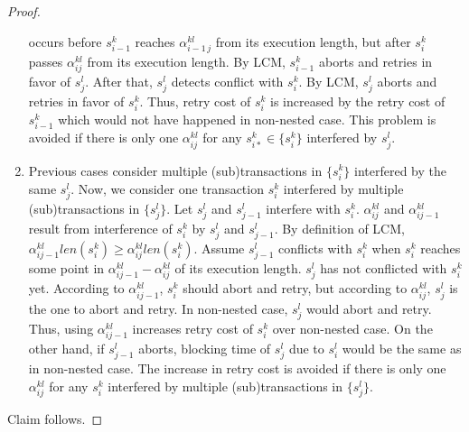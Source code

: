 \documentclass[10pt, conference, compsocconf]{IEEEtran}
\begin{document}
\begin{proof}
\begin{enumerate}
occurs before $s_{i-1}^{k}$ reaches $\alpha_{i-1\, j}^{kl}$ from
its execution length, but after $s_{i}^{k}$ passes $\alpha_{ij}^{kl}$
from its execution length. By LCM, $s_{i-1}^{k}$ aborts and retries
in favor of $s_{j}^{l}$. After that, $s_{j}^{l}$ detects conflict
with $s_{i}^{k}$. By LCM, $s_{j}^{l}$ aborts and retries in favor
of $s_{i}^{k}$. Thus, retry cost of $s_{i}^{k}$ is increased by
the retry cost of $s_{i-1}^{k}$ which would not have happened in
non-nested case. This problem is avoided if there is only one $\alpha_{ij}^{kl}$
for any $s_{i*}^{k}\in\{s_{i}^{k}\}$ interfered by $s_{j}^{l}$.
\item Previous cases consider multiple (sub)transactions in $\{s_{i}^{k}\}$
interfered by the same $s_{j}^{l}$. Now, we consider one transaction
$s_{i}^{k}$ interfered by multiple (sub)transactions in $\{s_{j}^{l}\}$.
Let $s_{j}^{l}$ and $s_{j-1}^{l}$ interfere with $s_{i}^{k}$. $\alpha_{ij}^{kl}$
and $\alpha_{ij-1}^{kl}$ result from interference of $s_{i}^{k}$
by $s_{j}^{l}$ and $s_{j-1}^{l}$. By definition of LCM, $\alpha_{ij-1}^{kl}len(s_{i}^{k})\ge\alpha_{ij}^{kl}len(s_{i}^{k})$.
Assume $s_{j-1}^{l}$ conflicts with $s_{i}^{k}$ when $s_{i}^{k}$
reaches some point in $\alpha_{ij-1}^{kl}-\alpha_{ij}^{kl}$ of its
execution length. $s_{j}^{l}$ has not conflicted with $s_{i}^{k}$
yet. According to $\alpha_{ij-1}^{kl}$, $s_{i}^{k}$ should abort
and retry, but according to $\alpha_{ij}^{kl}$, $s_{j}^{l}$ is the
one to abort and retry. In non-nested case, $s_{j}^{l}$ would abort
and retry. Thus, using $\alpha_{ij-1}^{kl}$ increases retry cost
of $s_{i}^{k}$ over non-nested case. On the other hand, if $s_{j-1}^{l}$
aborts, blocking time of $s_{j}^{l}$ due to $s_{i}^{l}$ would be
the same as in non-nested case. The increase in retry cost is avoided
if there is only one $\alpha_{ij}^{kl}$ for any $s_{i}^{k}$ interfered
by multiple (sub)transactions in $\{s_{j}^{l}\}$.
\end{enumerate}
Claim follows.

\end{proof}
\end{document}
